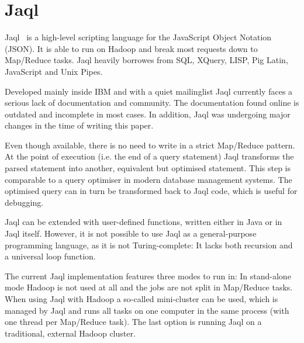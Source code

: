\section{Jaql}

Jaql~\cite{jaqlWebsite} is a high-level scripting language for the JavaScript Object Notation (JSON).
It is able to run on Hadoop and break most requests down to Map/Reduce tasks.
Jaql heavily borrowes from SQL, XQuery, LISP, Pig Latin, JavaScript and Unix Pipes.~\cite{jaqlOverview}

Developed mainly inside IBM and with a quiet mailinglist Jaql currently faces
a serious lack of documentation and community. The documentation found online
is outdated and incomplete in most cases. In addition, Jaql was undergoing
major changes in the time of writing this paper.

Even though available, there is no need to write in a strict Map/Reduce pattern. At the point of execution (i.e. the end of a query statement) Jaql transforms the
parsed statement into another, equivalent but optimised statement. This step is
comparable to a query optimiser in modern database management systems. The optimised
query can in turn be transformed back to Jaql code, which is useful for debugging.

Jaql can be extended with user-defined functions, written either in Java or
in Jaql itself. However, it is not possible to use Jaql as a general-purpose programming
language, as it is not Turing-complete: It lacks both recursion and a universal loop
function.

The current Jaql implementation features three modes to run in: In stand-alone mode Hadoop
is not used at all and the jobs are not split in Map/Reduce tasks. When using Jaql
with Hadoop a so-called mini-cluster can be used, which is managed by Jaql and runs all tasks
on one computer in the same process (with one thread per Map/Reduce task). The last option is running Jaql on a traditional, external Hadoop cluster.